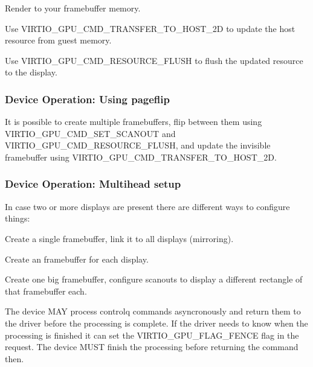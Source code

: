 \begin{itemize*}
\item Render to your framebuffer memory.
\item Use VIRTIO_GPU_CMD_TRANSFER_TO_HOST_2D to update the host resource
  from guest memory.
\item Use VIRTIO_GPU_CMD_RESOURCE_FLUSH to flush the updated resource
  to the display.
\end{itemize*}

\subsubsection{Device Operation: Using pageflip}

It is possible to create multiple framebuffers, flip between them
using VIRTIO_GPU_CMD_SET_SCANOUT and VIRTIO_GPU_CMD_RESOURCE_FLUSH,
and update the invisible framebuffer using
VIRTIO_GPU_CMD_TRANSFER_TO_HOST_2D.

\subsubsection{Device Operation: Multihead setup}

In case two or more displays are present there are different ways to
configure things:

\begin{itemize*}
\item Create a single framebuffer, link it to all displays
  (mirroring).
\item Create an framebuffer for each display.
\item Create one big framebuffer, configure scanouts to display a
  different rectangle of that framebuffer each.
\end{itemize*}


The device MAY process controlq commands asyncronously and return them
to the driver before the processing is complete.  If the driver needs
to know when the processing is finished it can set the
VIRTIO_GPU_FLAG_FENCE flag in the request.  The device MUST finish the
processing before returning the command then.

